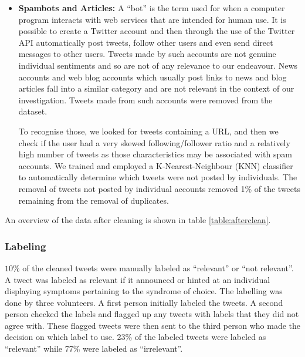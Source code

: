 \documentclass[10pt,letterpaper]{article}
\begin{document}
\begin{itemize}
  \item \textbf{Spambots and Articles: } A ``bot'' is the term used for when a computer program interacts with web services that are intended for human use.  It is possible to create a Twitter account and then through the use of the Twitter API automatically post tweets, follow other users and even send direct messages to other users. Tweets made by such accounts are not genuine individual sentiments and so are not of any relevance to our endeavour. News accounts and web blog accounts which usually post links to news and blog articles fall into a similar category and are not relevant in the context of our investigation. Tweets made from such accounts were removed from the dataset. 

To recognise those, we looked for tweets containing a URL, and then we check if the user had a very skewed following/follower ratio \cite{REF15} and a relatively high number of tweets as those characteristics may be associated with spam accounts. We trained and employed a K-Nearest-Neighbour (KNN)\cite{REF63} classifier to automatically determine which tweets were not posted by individuals. The removal of tweets not posted by individual accounts removed 1\% of the tweets remaining from the removal of duplicates.
 \end{itemize} 
 
An overview of the data after cleaning is shown in table \ref{table:afterclean}.  
 
 \subsubsection{Labeling}
  $10\%$ of the cleaned tweets were manually labeled as ``relevant'' or ``not relevant''. A tweet was labeled as relevant if it announced or hinted at an individual displaying symptoms pertaining to the syndrome of choice. The labelling was done by three volunteers. A first person initially labeled the tweets. A second person checked the labels and flagged up any tweets with labels that they did not agree with. These flagged tweets were then sent to the third person who made the decision on which label to use. 23\% of the labeled tweets were labeled as ``relevant'' while 77\% were labeled as ``irrelevant''. 
\end{document}
